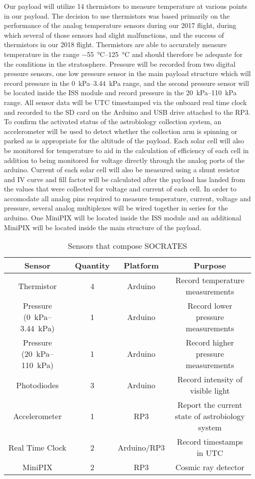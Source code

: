 Our payload will utilize 14 thermistors to measure temperature at various points in our payload. The decision to use thermistors was based primarily on the performance of the analog temperature sensors during our 2017 flight, during which several of those sensors had slight malfunctions, and the success of thermistors in our 2018 flight. Thermistors are able to accurately measure temperature in the range \SIrange{-55}{125}{\celsius} and should therefore be adequate for the conditions in the stratosphere. Pressure will be recorded from two digital pressure sensors, one low pressure sensor in the main payload structure which will record pressure in the \SIrange{0}{3.44}{\kilo\pascal} range, and the second pressure sensor will be located inside the ISS module and record pressure in the \SIrange{20}{110}{\kilo\pascal} range. All sensor data will be UTC timestamped via the onboard real time clock and recorded to the SD card on the Arduino and USB drive attached to the RP3. To confirm the activated status of the astrobiology collection system, an accelerometer will be used to detect whether the collection arm is spinning or parked as is appropriate for the altitude of the payload. Each solar cell will also be monitored for temperature to aid in the calculation of efficiency of each cell in addition to being monitored for voltage directly through the analog ports of the arduino. Current of each solar cell will also be measured using a shunt resistor and IV curve and fill factor will be calculated after the payload has landed from the values that were collected for voltage and current of each cell. In order to accomodate all analog pins required to measure temperature, current, voltage and pressure, several analog multiplexes will be wired together in series for the arduino. One MiniPIX will be located inside the ISS module and an additional MiniPIX will be located inside the main structure of the payload.

\begin{table}[h!]
\centering
\caption{Sensors that compose SOCRATES}
\label{tab:Sensors}
\bigskip
\begin{tabular}{cccc}
  \hline
  \hline
  \multicolumn{1}{c}{\bfseries Sensor} & {\bfseries Quantity} & {\bfseries Platform} & {\bfseries Purpose} \\
  \hline
  Thermistor & 4 & Arduino & Record temperature measurements  \\
  Pressure (\SIrange{0}{3.44}{\kilo\pascal}) & 1 & Arduino & Record lower pressure measurements \\
  Pressure (\SIrange{20}{110}{\kilo\pascal}) & 1 & Arduino & Record higher pressure measurements \\
  Photodiodes & 3 & Arduino & Record intensity of visible light \\
  Accelerometer & 1 & RP3 & Report the current state of astrobiology system \\
  Real Time Clock & 2 & Arduino/RP3 & Record timestamps in UTC \\
  MiniPIX & 2 & RP3 & Cosmic ray detector \\
  \hline
  \hline
\end{tabular}
\end{table}



